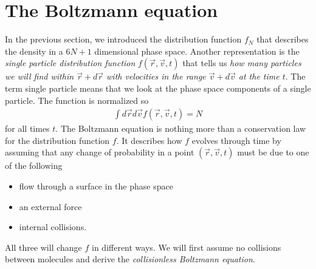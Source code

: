 \section{The Boltzmann equation}
\label{sec:boltzmann_equation}
In the previous section, we introduced the distribution function $f_N$ that describes the density in a $6N+1$ dimensional phase space. Another representation is the \textit{single particle distribution function} $f(\vec r, \vec v, t)$ that tells us \textit{how many particles we will find within $\vec r + d\vec r$ with velocities in the range $\vec v + d\vec v$ at the time $t$}. The term single particle means that we look at the phase space components of a single particle. The function is normalized so
\begin{align}
	\int d\vec r d\vec v f(\vec r, \vec v, t) = N
\end{align}
for all times $t$. The Boltzmann equation is nothing more than a conservation law for the distribution function $f$. It describes how $f$ evolves through time by assuming that any change of probability in a point $(\vec r, \vec v, t)$ must be due to one of the following
\begin{itemize}
	\item flow through a surface in the phase space
	\item an external force
	\item internal collisions.
\end{itemize}
All three will change $f$ in different ways. We will first assume no collisions between molecules and derive the \textit{collisionless Boltzmann equation}. 
